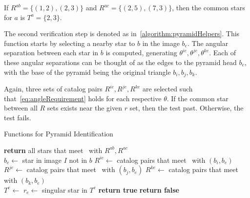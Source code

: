 If $R^{ab} = \{ (1, 2), (2, 3) \}$ and $R^{ac} = \{ (2, 5), (7, 3) \}$, then the common stars for $a$ is
$T^a = \{2, 3\}$.


The second verification step is denoted as  in~\autoref{algorithm:pyramidHelpers}.
This function starts by selecting a nearby star to $b$ in the image $b_e$.
The angular separation between each star in $b$ is computed, generating $\theta^{ie}, \theta^{je},
\theta^{ke}$.
Each of these angular separations can be thought of as the edges to the pyramid head $b_e$, with the base of the pyramid
being the original triangle $b_i, b_j, b_k$.

Again, three sets of catalog pairs $R^{ie}, R^{je}, R^{ke}$ are selected such that~\autoref{eq:angleRequirement} holds
for each respective $\theta$.
If the common star between all $R$ sets exists near the given $r$ set, then the test past.
Otherwise, the test fails.

\begin{algorithm}
    \caption{Functions for Pyramid Identification} \label{algorithm:pyramidHelpers}
    \begin{algorithmic}[1]
        \State \textbf{return} all stars that meet~ with $R^{ab}, R^{ac}$
        \EndFunction
        \\
        \State $b_e \gets $ star in image $I$ not in $b$
        \State $R^{ie} \gets$ catalog pairs that meet~ with $(b_i, b_e)$
        \State $R^{je} \gets$ catalog pairs that meet~ with $(b_j, b_e)$
        \State $R^{ke} \gets$ catalog pairs that meet~ with $(b_k, b_e)$
        \\
        \State $T^e \gets $ 
        \State $r_e \gets $ singular star in $T^e$
        \State \textbf{return true}
        \EndIf
        \EndIf
        \State \textbf{return false}
        \EndFunction
    \end{algorithmic}
\end{algorithm}

